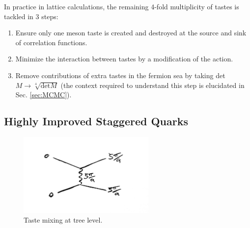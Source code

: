     In practice in lattice calculations, the remaining 4-fold multiplicity of tastes is tackled in 3 steps:
    \begin{enumerate}
    \item
      Ensure only one meson taste is created and destroyed at the source and sink of correlation functions. 
    \item
      Minimize the interaction between tastes by a modification of the action.
    \item
      Remove contributions of extra tastes in the fermion sea by taking det$M \to \sqrt[4]{\text{det}M}$ (the context required to understand this step is elucidated in Sec. \ref{sec:MCMC}).
    \end{enumerate}


    \subsection{Highly Improved Staggered Quarks}
    \label{sec:HISQ}

    \begin{figure}
      \vspace{-10pt}
      \begin{center}
        \includegraphics[width=
          0.6\textwidth]{images/taste_exchange.jpg}
      \end{center}
      \vspace{-30pt}
      \caption{Taste mixing at tree level.}
      \label{fig:tastemixing}
    \end{figure}


